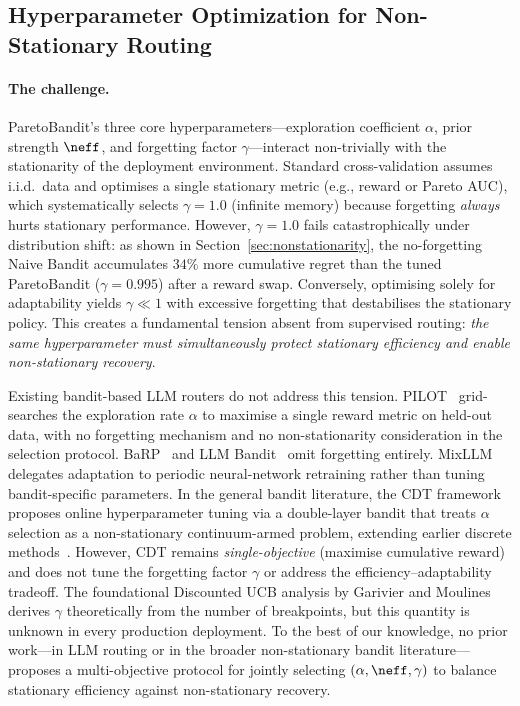 
\subsection{Hyperparameter Optimization for Non-Stationary Routing}
\label{sec:hparam_sweep}

\paragraph{The challenge.}
ParetoBandit's three core hyperparameters---exploration coefficient
$\alpha$, prior strength $\neff$, and forgetting factor
$\gamma$---interact non-trivially with the stationarity of the
deployment environment.
Standard cross-validation assumes i.i.d.\ data and optimises a
single stationary metric (e.g., reward or Pareto AUC), which
systematically selects $\gamma{=}1.0$ (infinite memory)
because forgetting \emph{always} hurts stationary performance.
However, $\gamma{=}1.0$ fails catastrophically under distribution
shift: as shown in Section~\ref{sec:nonstationarity}, the
no-forgetting Naive Bandit accumulates $34\%$ more cumulative regret
than the tuned ParetoBandit ($\gamma{=}0.995$) after a reward swap.
Conversely, optimising solely for adaptability yields
$\gamma \ll 1$ with excessive forgetting that destabilises the
stationary policy.
This creates a fundamental tension absent from supervised routing:
\emph{the same hyperparameter must simultaneously protect stationary
efficiency and enable non-stationary recovery}.

Existing bandit-based LLM routers do not address this tension.
PILOT~\cite{panda2025pilot} grid-searches the exploration rate
$\alpha$ to maximise a single reward metric on held-out data,
with no forgetting mechanism and no non-stationarity consideration
in the selection protocol.
BaRP~\cite{wang2025barp} and LLM Bandit~\cite{li2025llmbandit}
omit forgetting entirely.
MixLLM~\cite{wang2025mixllm} delegates adaptation to periodic
neural-network retraining rather than tuning bandit-specific
parameters.
In the general bandit literature, the CDT framework~\cite{kang2024cdt}
proposes online hyperparameter tuning via a double-layer bandit that
treats $\alpha$ selection as a non-stationary continuum-armed problem,
extending earlier discrete methods~\cite{bouneffouf2020oplinucb}.
However, CDT remains \emph{single-objective} (maximise cumulative
reward) and does not tune the forgetting factor $\gamma$ or address
the efficiency--adaptability tradeoff.
The foundational Discounted UCB analysis by
Garivier and Moulines~\cite{garivier2011switching} derives $\gamma$
theoretically from the number of breakpoints, but this quantity is
unknown in every production deployment.
To the best of our knowledge, no prior work---in LLM routing or in
the broader non-stationary bandit literature---proposes a
multi-objective protocol for jointly selecting $(\alpha, \neff,
\gamma)$ to balance stationary efficiency against non-stationary
recovery.

